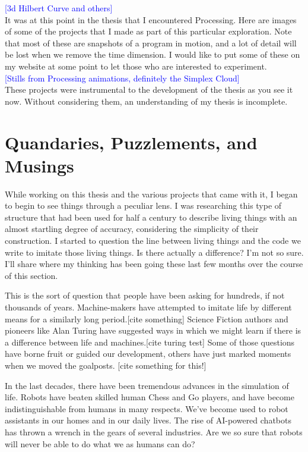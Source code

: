 \documentclass[12pt,twoside]{reedthesis}
\begin{document}
	\textcolor{blue}{[3d Hilbert Curve and others]}\\
	
	It was at this point in the thesis that I encountered Processing. Here are images of some of the projects that I made as part of this particular exploration. Note that most of these are snapshots of a program in motion, and a lot of detail will be lost when we remove the time dimension. I would like to put some of these on my website at some point to let those who are interested to experiment.\\
	
	\textcolor{blue}{[Stills from Processing animations, definitely the Simplex Cloud]}\\
	
	These projects were instrumental to the development of the thesis as you see it now. Without considering them, an understanding of my thesis is incomplete.

\section{Quandaries, Puzzlements, and Musings}
\label{Questions}

	While working on this thesis and the various projects that came with it, I began to begin to see things through a peculiar lens. I was researching this type of structure that had been used for half a century to describe living things with an almost startling degree of accuracy, considering the simplicity of their construction. I started to question the line between living things and the code we write to imitate those living things. Is there actually a difference? I'm not so sure. I'll share where my thinking has been going these last few months over the course of this section.
	
	This is the sort of question that people have been asking for hundreds, if not thousands of years. Machine-makers have attempted to imitate life by different means for a similarly long period.[cite something] Science Fiction authors and pioneers like Alan Turing have suggested ways in which we might learn if there is a difference between life and machines.[cite turing test] Some of those questions have borne fruit or guided our development, others have just marked moments when we moved the goalposts. [cite something for this!] 
	
	In the last decades, there have been tremendous advances in the simulation of life. Robots have beaten skilled human Chess and Go players, and have become indistinguishable from humans in many respects. We've become used to robot assistants in our homes and in our daily lives. The rise of AI-powered chatbots has thrown a wrench in the gears of several industries. Are we so sure that robots will never be able to do what we as humans can do?\\
	
\end{document}
